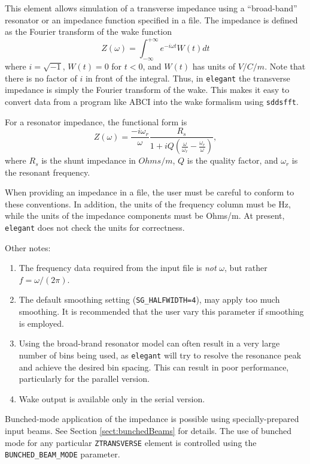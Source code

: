 This element allows simulation of a transverse impedance using a
``broad-band'' resonator or an impedance function specified in a file.
The impedance is defined as the Fourier transform of the wake function
\begin{equation}
Z(\omega) = \int_{-\infty}^{+\infty} e^{-i \omega t} W(t) dt
\end{equation}
where $i = \sqrt{-1}$, $W(t)=0$ for $t<0$, and $W(t)$ has units of
$V/C/m$.  Note that there is no factor of $i$ in front of the
integral.  Thus, in {\tt elegant} the transverse impedance is simply
the Fourier transform of the wake.  This makes it easy to convert data
from a program like ABCI into the wake formalism using {\tt sddsfft}.

For a resonator impedance, the functional form is
\begin{equation}
Z(\omega) = \frac{-i\omega_r}{\omega} \frac{R_s}{1 + iQ(\frac{\omega}{\omega_r} - \frac{\omega_r}{\omega})},
\end{equation}
where $R_s$ is the shunt impedance in $Ohms/m$, $Q$ is the quality
factor, and $\omega_r$ is the resonant frequency.

When providing an impedance in a file, the user must be careful to conform to these
conventions.
In addition, the units of the frequency column must be Hz, while the units
of the impedance components must be Ohms/m.
At present, {\tt elegant} does not check the units for correctness.

Other notes:
\begin{enumerate}
\item The frequency data required from the input file is {\em not} $\omega$, but rather
  $f = \omega/(2 \pi)$.
\item The default smoothing setting ({\tt SG\_HALFWIDTH=4}), may apply too much smoothing.
  It is recommended that the user vary this parameter if smoothing is employed.
\item Using the broad-brand resonator model can often result in a very large number of bins
 being used, as {\tt elegant} will try to resolve the resonance peak and achieve the desired
 bin spacing. This can result in poor performance, particularly for the parallel version.
\item Wake output is available only in the serial version.
\end{enumerate}

Bunched-mode application of the impedance is possible using specially-prepared input
beams. 
See Section \ref{sect:bunchedBeams} for details.
The use of bunched mode for any particular \verb|ZTRANSVERSE| element is controlled using the \verb|BUNCHED_BEAM_MODE| parameter.
